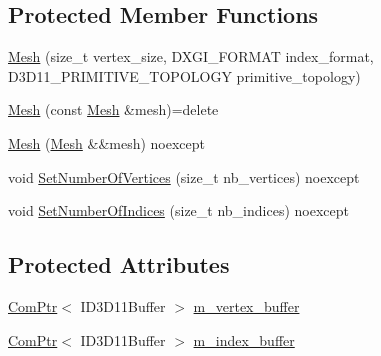 \subsection*{Protected Member Functions}
\begin{DoxyCompactItemize}
\item 
\mbox{\hyperlink{classmage_1_1rendering_1_1_mesh_a3113bd0dd48a82ae03e0a07d971494da}{Mesh}} (size\+\_\+t vertex\+\_\+size, D\+X\+G\+I\+\_\+\+F\+O\+R\+M\+AT index\+\_\+format, D3\+D11\+\_\+\+P\+R\+I\+M\+I\+T\+I\+V\+E\+\_\+\+T\+O\+P\+O\+L\+O\+GY primitive\+\_\+topology)
\item 
\mbox{\hyperlink{classmage_1_1rendering_1_1_mesh_a42e4cab2db663fa8d7f2c8651f30894b}{Mesh}} (const \mbox{\hyperlink{classmage_1_1rendering_1_1_mesh}{Mesh}} \&mesh)=delete
\item 
\mbox{\hyperlink{classmage_1_1rendering_1_1_mesh_aeb090ec9531823157f010a70a9dabf45}{Mesh}} (\mbox{\hyperlink{classmage_1_1rendering_1_1_mesh}{Mesh}} \&\&mesh) noexcept
\item 
void \mbox{\hyperlink{classmage_1_1rendering_1_1_mesh_abf2fc84400607b6579028eff66eb179e}{Set\+Number\+Of\+Vertices}} (size\+\_\+t nb\+\_\+vertices) noexcept
\item 
void \mbox{\hyperlink{classmage_1_1rendering_1_1_mesh_acd34fa8466235d5e17dd0f9be60fd5ea}{Set\+Number\+Of\+Indices}} (size\+\_\+t nb\+\_\+indices) noexcept
\end{DoxyCompactItemize}
\subsection*{Protected Attributes}
\begin{DoxyCompactItemize}
\item 
\mbox{\hyperlink{namespacemage_ae74f374780900893caa5555d1031fd79}{Com\+Ptr}}$<$ I\+D3\+D11\+Buffer $>$ \mbox{\hyperlink{classmage_1_1rendering_1_1_mesh_aa3cf2b0ad192e2b3b371655ee49eb4f4}{m\+\_\+vertex\+\_\+buffer}}
\item 
\mbox{\hyperlink{namespacemage_ae74f374780900893caa5555d1031fd79}{Com\+Ptr}}$<$ I\+D3\+D11\+Buffer $>$ \mbox{\hyperlink{classmage_1_1rendering_1_1_mesh_a113b12e839a22e62cb45991805586689}{m\+\_\+index\+\_\+buffer}}
\end{DoxyCompactItemize}
